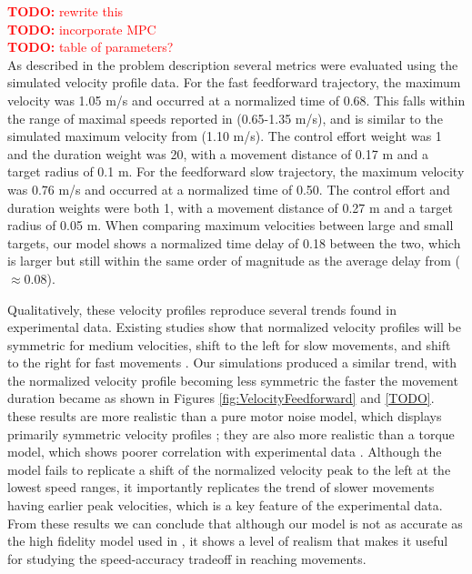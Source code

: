\documentclass[letterpaper, 10pt, conference]{ieeeconf}
\newcommand{\todo}[1]{\textcolor{red}{\textbf{TODO:} #1}}
\begin{document}
\todo{rewrite this} \\
\todo{incorporate MPC} \\
\todo{table of parameters?} \\
As described in the problem description several metrics were evaluated using the simulated velocity profile data. For the fast feedforward trajectory, the maximum velocity was 1.05 m/s and occurred at a normalized time of 0.68. This falls within the range of maximal speeds reported in \cite{soechting_target_size} (0.65-1.35 m/s), and is similar to the simulated maximum velocity from \cite{original_paper_high_fidelity} (1.10 m/s). The control effort weight was 1 and the duration weight was 20, with a movement distance of 0.17 m and a target radius of 0.1 m. For the feedforward slow trajectory, the maximum velocity was 0.76 m/s and occurred at a normalized time of 0.50. The control effort and duration weights were both 1, with a movement distance of 0.27 m and a target radius of 0.05 m. 
When comparing maximum velocities between large and small targets, our model shows a normalized time delay of 0.18 between the two, which is larger but still within the same order of magnitude as the average delay from \cite{soechting_target_size} ($\approx 0.08$). 

Qualitatively, these velocity profiles reproduce several trends found in experimental data.
Existing studies show that normalized velocity profiles will be symmetric for medium velocities, shift to the left for slow movements, and shift to the right for fast movements \cite{asymmetric_vel_acc}\cite{human_vel_curves}. 
Our simulations produced a similar trend, with the normalized velocity profile becoming less symmetric the faster the movement duration became as shown in Figures \ref{fig:VelocityFeedforward} and \ref{TODO}. 
these results are more realistic than a pure motor noise model, which displays primarily symmetric velocity profiles \cite{c2}; they are also more realistic than a torque model, which shows poorer correlation with experimental data \cite{5}.
Although the model fails to replicate a shift of the normalized velocity peak to the left at the lowest speed ranges, it importantly replicates the trend of slower movements having earlier peak velocities, which is a key feature of the experimental data.
From these results we can conclude that although our model is not as accurate as the high fidelity model used in \cite{original_paper_high_fidelity}, it shows a level of realism that makes it useful for studying the speed-accuracy tradeoff in reaching movements.
\end{document}
